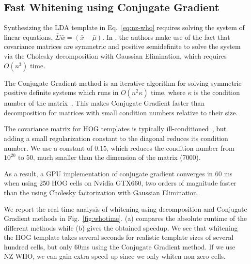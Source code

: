 \subsection{Fast Whitening using Conjugate Gradient}
\label{sec:fastwhiten}

Synthesizing the LDA template in Eq.~\ref{eq:nz-who} requires solving the system of
linear equations, $\bar{\Sigma} \bar{w} = (\bar{x} - \bar{\mu})$. In
\cite{Hariharan12}, the authors make use of the fact that covariance matrices
are symmetric and positive semidefinite to solve the system via the Cholesky
decomposition with Gaussian Elimination, which requires $O(n^3)$ time.

The Conjugate Gradient method is an iterative algorithm for solving symmetric
positive definite systems which runs in $O(n^2\kappa)$ time, where $\kappa$ is
the condition number of the matrix~\cite{Shewchuk94}.
%
This makes Conjugate Gradient faster than decomposition for matrices with small
condition numbers relative to their size.

The covariance matrix for HOG templates is typically
ill-conditioned~\cite{Hariharan12}, but adding a small regularization constant to
the diagonal reduces its condition number.
We use a constant of $0.15$, which reduces the condition number from $10^{20}$
to $50$, much smaller than the dimension of the matrix (7000).

As a result, a GPU implementation of conjugate gradient converges in 60
ms when using 250 HOG cells on Nvidia GTX660, two orders of magnitude faster
than the using Cholesky factorization with Gaussian Elimination.

We report the real time analysis of whitening using decomposition and
Conjugate Gradient methods in Fig.~\ref{fig:whotime}. (a) compares the
absolute runtime of the different methods while (b) gives the obtained
speedup. We see that %
whitening the HOG template takes several seconds for realistic template sizes of
several hundred cells, but only 60ms using the Conjugate Gradient
method. If we use NZ-WHO, we can gain extra speed
up since we only whiten non-zero cells.

